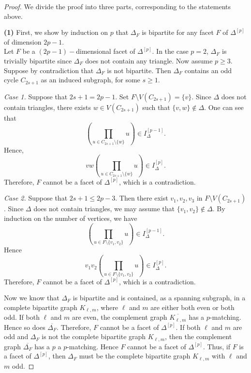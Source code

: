 \documentclass[12pt]{amsart}
\begin{document}
\begin{proof}

We divide the proof into three parts, corresponding to the statements above.

\textbf{(1)} First, we show by induction on $p$ that $\Delta_F$ is bipartite for any facet $F$ of $\Delta^{[p]}$ of dimension $2p-1$. \\
Let $F$ be a $(2p-1)-$dimensional facet of $\Delta^{[p]}$. %
In the case $p=2$, $\Delta_F$ is trivially bipartite since $\Delta_F$ does not contain any triangle. Now assume $p \ge 3$. Suppose by contradiction that $\Delta_F$ is not bipartite. Then $\Delta_F$ contains an odd cycle $C_{2s+1}$ as an induced subgraph, for some $s\geq 1$.

\textit{Case 1.} Suppose that $2s+1 = 2p-1$.
Set $F \setminus V(C_{2s+1}) = \{v\}$.
Since $\Delta$ does not contain triangles, there exists $w \in V(C_{2s+1})$ such that $\{v,w\} \notin \Delta$.
One can see that
$$
\left( \prod_{u \in C_{2s+1} \setminus \{w\}} u \right)\in I_{\Delta}^{[p-1]}.
$$
Hence,
$$
vw \left( \prod_{u \in C_{2s+1} \setminus \{w\}} u \right)\in I_{\Delta}^{[p]}.
$$
Therefore, $F$ cannot be a facet of $\Delta^{[p]}$, which is a contradiction.

\textit{Case 2.} Suppose that $2s+1 \le 2p-3$.
Then there exist $v_1, v_2, v_3$ in $F \setminus V(C_{2s+1})$.
Since $\Delta$ does not contain triangles, we may assume that $\{v_1,v_2\} \notin \Delta$.
By induction on the number of vertices, we have
$$
\left(\prod_{u \in F \setminus \{v_1, v_2\}} u\right) \in I_{\Delta}^{[p-1]}.
$$
Hence
$$
v_1 v_2 \left(\prod_{u \in F \setminus \{v_1, v_2\}} u\right) \in I_{\Delta}^{[p]}.
$$
Therefore, $F$ cannot be a facet of $\Delta^{[p]}$, which is a contradiction.

Now we know that $\Delta_F$ is bipartite and is contained, as a spanning subgraph, in a complete bipartite graph $K_{\ell,m}$, where $\ell$ and $m$ are either both even or both odd.
If both $\ell$ and $m$ are even, the complement graph $\overline{K_{\ell,m}}$ has a $p$-matching. Hence so does $\overline{\Delta_F}$. Therefore, $F$ cannot be a facet of $\Delta^{[p]}$.
If both $\ell$ and $m$ are odd and $\Delta_F$ is not the complete bipartite graph $K_{\ell,m}$, then the complement graph $\overline{\Delta_F}$ has a $p$ a $p$-matching. Hence $F$ cannot be a facet of $\Delta^{[p]}$.
Thus, if $F$ is a facet of $\Delta^{[p]}$, then $\Delta_F$ must be the complete bipartite graph $K_{\ell,m}$ with $\ell$ and $m$ odd.


\end{proof}
\end{document}
